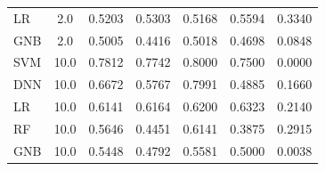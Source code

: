 \begin{table}[h]
\begin{tabular}{lcccccc}
LR & 2.0 & 0.5203 & 0.5303 & 0.5168 & 0.5594 & 0.3340 \\
GNB & 2.0 & 0.5005 & 0.4416 & 0.5018 & 0.4698 & 0.0848 \\
\hline
SVM & 10.0 & 0.7812 & 0.7742 & 0.8000 & 0.7500 & 0.0000 \\
DNN & 10.0 & 0.6672 & 0.5767 & 0.7991 & 0.4885 & 0.1660 \\
LR & 10.0 & 0.6141 & 0.6164 & 0.6200 & 0.6323 & 0.2140 \\
RF & 10.0 & 0.5646 & 0.4451 & 0.6141 & 0.3875 & 0.2915 \\
GNB & 10.0 & 0.5448 & 0.4792 & 0.5581 & 0.5000 & 0.0038 \\
\hline
\end{tabular}
\end{table}